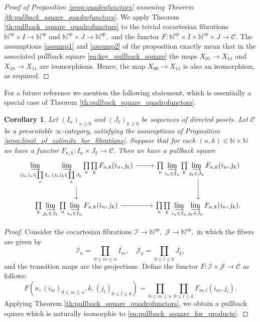 \documentclass[11pt,leqno]{amsart}
\newtheorem{cor}[theo]{Corollary}
\numberwithin{equation}{section}
\def\N{\mathbb{N}}
\newcommand{\indlim}[1][]{\mathop{\varinjlim}\limits_{#1}}
\newcommand{\prodd}[1][]{\mathop{\prod}\limits_{#1}}
\newcommand{\cJ}{{\mathcal J}}
\newcommand{\cI}{{\mathcal I}}
\newcommand{\cC}{{\mathcal C}}
\begin{document}
\begin{proof}[Proof of Proposition \ref{prop:quadrofunctors} assuming Theorem \ref{th:pullback_square_quadrofunctors}] 
We apply Theorem \ref{th:pullback_square_quadrofunctors} to the trivial cocartesian fibrations $\N^{op}\times I\to \N^{op}$ and $\N^{op}\times J\to\N^{op},$ and the functor $F:\N^{op}\times I\times \N^{op}\times J\to\cC.$ The assumptions \ref{assump1} and \ref{assump2} of the proposition exactly mean that in the associated pullback square \eqref{eq:key_pullback_square} the maps $X_{01}\to X_{11}$ and $X_{10}\to X_{11}$ are isomorphisms. Hence, the map $X_{00}\to X_{11}$ is also an isomorphism, as required.
\end{proof}

For a future reference we mention the following statement, which is essentially a special case of Theorem \ref{th:pullback_square_quadrofunctors}.

\begin{cor}\label{cor:pullback_square_products_and_colimits}
Let $(I_n)_{n\geq 0}$ and $(J_k)_{k\geq 0}$ be sequences of directed posets. Let $\cC$ be a presentable $\infty$-category, satisfying the assumptions of Proposition \ref{prop:limit_of_colimits_for_fibrations}. Suppose that for each $(n,k)\in\N\times\N$ we have a functor $F_{n,k}:I_n\times J_k\to\cC.$ Then we have a pullback square
\begin{equation}\label{eq:pullback_square_for_products}
\begin{tikzcd}
\indlim[(i_n)_n\in\prod\limits_{n} I_n]\indlim[(j_k)_k\in\prod\limits_{k} J_k]\prodd[n]\prodd[k]F_{n,k}(i_n,j_k)\ar[r]\ar[d] & \prodd[n]\indlim[i_n\in I_n]\prodd[k]\indlim[j_k\in J_k] F_{n,k}(i_n,j_k)\ar[d]\\
\prodd[k]\indlim[j_k\in J_k]\prodd[n]\indlim[i_n\in I_n] F_{n,k}(i_n,j_k)\ar[r] & \prodd[n]\prodd[k]\indlim[i_n\in I_n]\indlim[j_k\in J_k]F_{n,k}(i_n,j_k).
\end{tikzcd}
\end{equation}
\end{cor}

\begin{proof}
Consider the cocartesian fibrations $\cI\to\N^{op},$ $\cJ\to\N^{op},$ in which the fibers are given by
\begin{equation*}
\cI_n=\prodd[0\leq m\leq n] I_m,\quad \cJ_k=\prodd[0\leq l\leq k] J_k,
\end{equation*}
and the transition maps are the projections. Define the functor $F:\cI\times\cJ\to\cC$ as follows:
\begin{equation*}
F(n,(i_m)_{0\leq m\leq n},k,(j_l)_{0\leq l\leq k})=\prodd[0\leq m\leq n]\prodd[0\leq l\leq k]F_{m,l}(i_m,j_l).
\end{equation*}
Applying Theorem \ref{th:pullback_square_quadrofunctors}, we obtain a pullback square which is naturally isomorphic to \eqref{eq:pullback_square_for_products}.
\end{proof}
\end{document}
